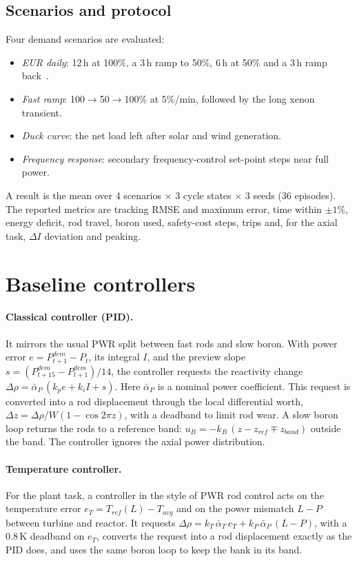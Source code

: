 \documentclass[11pt,a4paper]{article}
\begin{document}
\subsection{Scenarios and protocol}

Four demand scenarios are evaluated:
\begin{itemize}
  \item \emph{EUR daily}: 12\,h at 100\%, a 3\,h ramp to 50\%, 6\,h at 50\% and a
  3\,h ramp back~\cite{eur}.
  \item \emph{Fast ramp}: 100$\to$50$\to$100\% at 5\%/min, followed by the long xenon
  transient.
  \item \emph{Duck curve}: the net load left after solar and wind generation.
  \item \emph{Frequency response}: secondary frequency-control set-point steps near
  full power.
\end{itemize}
A result is the mean over 4 scenarios $\times$ 3 cycle states $\times$ 3 seeds
(36 episodes). The reported metrics are tracking RMSE and maximum error, time within
$\pm1\%$, energy deficit, rod travel, boron used, safety-cost steps, trips and, for the
axial task, $\Delta I$ deviation and peaking.

\section{Baseline controllers}\label{sec:baselines}

\paragraph{Classical controller (PID).} It mirrors the usual PWR split between fast
rods and slow boron. With power error $e = P^{dem}_{t+1} - P_t$, its integral $I$, and
the preview slope $s = (P^{dem}_{t+15} - P^{dem}_{t+1})/14$, the controller requests the
reactivity change
$\Delta\rho = \bar\alpha_P\,(k_p e + k_i I + s)$. Here $\bar\alpha_P$ is a nominal
power coefficient. This request is converted into a rod displacement through the local
differential worth, $\Delta z = \Delta\rho / W(1 - \cos 2\pi z)$, with a deadband to
limit rod wear. A slow boron loop returns the rods to a reference band:
$u_B = -k_B\,(z - z_{ref} \mp z_{band})$ outside the band. The controller ignores the
axial power distribution.

\paragraph{Temperature controller.} For the plant task, a controller in the style of
PWR rod control acts on the temperature error $e_T = T_{ref}(L) - T_{avg}$ and on the
power mismatch $L - P$ between turbine and reactor. It requests
$\Delta\rho = k_T\,\bar\alpha_T\,e_T + k_P\,\bar\alpha_P\,(L - P)$, with a 0.8\,K deadband
on $e_T$, converts the request into a rod displacement exactly as the PID does, and uses
the same boron loop to keep the bank in its band.
\end{document}
